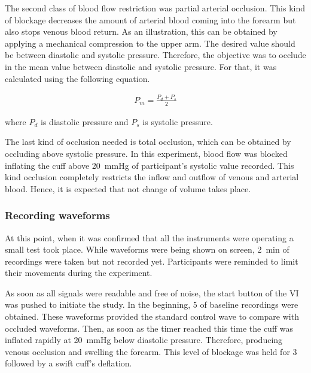 The second class of blood flow restriction was partial arterial occlusion. This kind of blockage decreases the amount of arterial blood coming into the forearm but also stops venous blood return. As an illustration, this can be obtained by applying a mechanical compression to the upper arm. The desired value should be between diastolic and systolic pressure. Therefore, the objective was to occlude in the mean value between diastolic and systolic pressure. For that, it was calculated using the following equation.


\begin{align}
\label{eq:meanpressure}
P_m = \frac{P_d + P_s}{2}
\end{align}

where $P_d$ is diastolic pressure and $P_s$ is systolic pressure. 

The last kind of occlusion needed is total occlusion, which can be obtained by occluding above systolic pressure. In this experiment, blood flow was blocked inflating the cuff above \SI{20}{\mmHg} of participant's systolic value recorded. This kind occlusion completely restricts the inflow and outflow of venous and arterial blood. Hence, it is expected that not change of volume takes place.

\subsubsection{Recording waveforms}

At this point, when it was confirmed that all the instruments were operating a small test took place. While waveforms were being shown on screen, \SI{2}{min} of recordings were taken but not recorded yet. Participants were reminded to limit their movements during the experiment. 

As soon as all signals were readable and free of noise, the start button of the VI was pushed to initiate the study. In the beginning, \SI{5}{\min} of baseline recordings were obtained. These waveforms provided the standard control wave to compare with occluded waveforms. Then, as soon as the timer reached this time the cuff was inflated rapidly at \SI{20}{\mmHg} below diastolic pressure. Therefore, producing venous occlusion and swelling the forearm. This level of blockage was held for \SI{3}{\min} followed by a swift cuff's deflation. 

